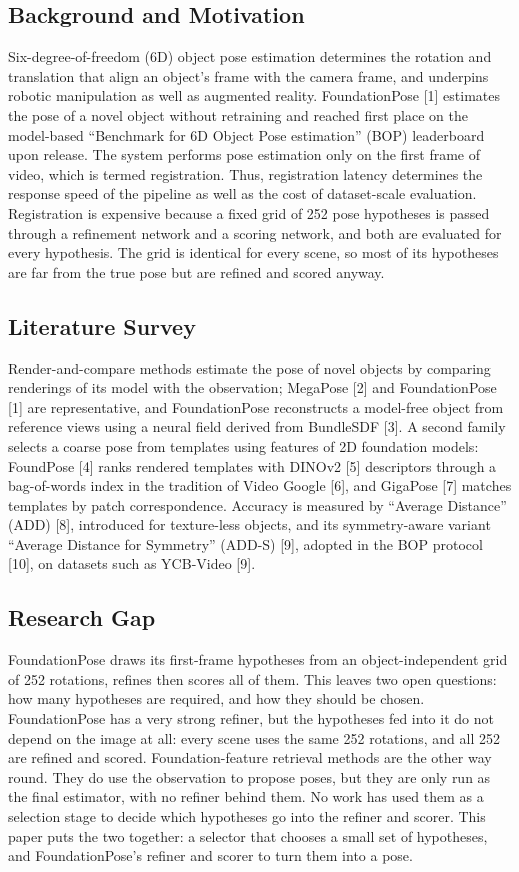 \documentclass[10pt,twocolumn,letterpaper]{article}
\begin{document}
\subsection{Background and Motivation}
Six-degree-of-freedom (6D) object pose estimation determines the rotation and translation that align an object's frame with the camera frame, and underpins robotic manipulation as well as augmented reality. FoundationPose [1] estimates the pose of a novel object without retraining and reached first place on the model-based ``Benchmark for 6D Object Pose estimation'' (BOP) leaderboard upon release. The system performs pose estimation only on the first frame of video, which is termed registration. Thus, registration latency determines the response speed of the pipeline as well as the cost of dataset-scale evaluation. Registration is expensive because a fixed grid of 252 pose hypotheses is passed through a refinement network and a scoring network, and both are evaluated for every hypothesis. The grid is identical for every scene, so most of its hypotheses are far from the true pose but are refined and scored anyway.

\subsection{Literature Survey}
Render-and-compare methods estimate the pose of novel objects by comparing renderings of its model with the observation; MegaPose [2] and FoundationPose [1] are representative, and FoundationPose reconstructs a model-free object from reference views using a neural field derived from BundleSDF [3]. A second family selects a coarse pose from templates using features of 2D foundation models: FoundPose [4] ranks rendered templates with DINOv2 [5] descriptors through a bag-of-words index in the tradition of Video Google [6], and GigaPose [7] matches templates by patch correspondence. Accuracy is measured by ``Average Distance'' (ADD) [8], introduced for texture-less objects, and its symmetry-aware variant ``Average Distance for Symmetry'' (ADD-S) [9], adopted in the BOP protocol [10], on datasets such as YCB-Video [9].

\subsection{Research Gap}
FoundationPose draws its first-frame hypotheses from an object-independent grid of 252 rotations, refines then scores all of them. This leaves two open questions: how many hypotheses are required, and how they should be chosen. FoundationPose has a very strong refiner, but the hypotheses fed into it do not depend on the image at all: every scene uses the same 252 rotations, and all 252 are refined and scored. Foundation-feature retrieval methods are the other way round. They do use the observation to propose poses, but they are only run as the final estimator, with no refiner behind them. No work has used them as a selection stage to decide which hypotheses go into the refiner and scorer. This paper puts the two together: a selector that chooses a small set of hypotheses, and FoundationPose's refiner and scorer to turn them into a pose.
\end{document}
